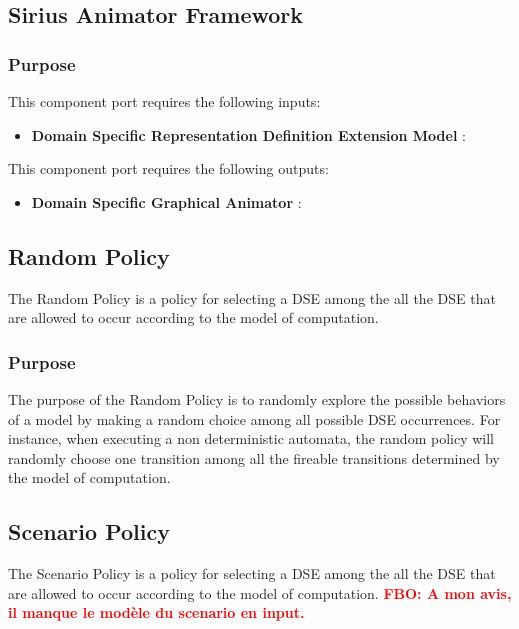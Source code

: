\documentclass{gemoc} %
\begin{document}
\subsection{Sirius Animator Framework}


\subsubsection{Purpose}

This component port requires the following inputs:
\begin{itemize}
  \item \textbf{Domain Specific Representation Definition Extension Model} :
\end{itemize}

This component port requires the following outputs:
\begin{itemize}
  \item \textbf{Domain Specific Graphical Animator} :
\end{itemize}

\subsection{Random Policy}
The Random Policy is a policy for selecting a DSE among the all the DSE that are allowed to occur according to the model of computation.

\subsubsection{Purpose}
The purpose of the Random Policy is to randomly explore the possible behaviors of a model by making a random choice among all possible DSE occurrences. For instance, when executing a non deterministic automata, the random policy will randomly choose one transition among all the fireable transitions determined by the model of computation.


\subsection{Scenario Policy}
The Scenario Policy is a policy for selecting a DSE among the all the DSE that are allowed to occur according to the model of computation.
\textcolor{red}{\textbf{FBO: A mon avis, il manque le modèle du scenario en input.}}
\end{document}
